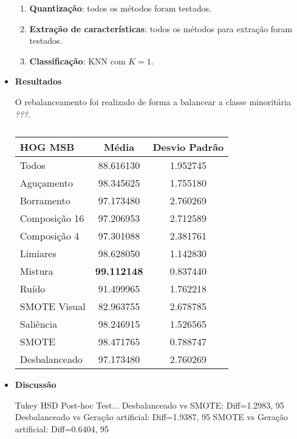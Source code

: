 \begin{itemize}
\begin{enumerate}
\item \textbf{Quantização}: todos os métodos foram testados.
\item \textbf{Extração de características}: todos os métodos para extração foram testados.
\item \textbf{Classificação}: KNN com $K=1$.
\end{enumerate}

\item[] \textbf{Resultados}

O rebalanceamento foi realizado de forma a balancear a classe minoritária \textit{???}.

\begin{minipage}{\linewidth}
\begin{table}[H]
\begin{center}
\caption{}
\label{tab:resultados:4.1}
\begin{tabular}{|l|c|c|}
\hline
\textbf{HOG MSB} & \textbf{Média}     & \textbf{Desvio Padrão} \\ \hline
   Todos        &  88.616130 &  1.952745  \\ \hline
  Aguçamento    &  98.345625 &  1.755180  \\ \hline
  Borramento    &  97.173480 &  2.760269  \\ \hline
  Composição 16 &  97.206953 &  2.712589  \\ \hline
  Composição 4  &  97.301088 &  2.381761  \\ \hline
  Limiares      &  98.628050 &  1.142830  \\ \hline
  Mistura       &  \textbf{99.112148} &  0.837440  \\ \hline
  Ruído         &  91.499965 &  1.762218  \\ \hline
  SMOTE Visual  &  82.963755 &  2.678785  \\ \hline
  Saliência     &  98.246915 &  1.526565  \\ \hline
 SMOTE          &  98.471765 &  0.788747  \\ \hline
Desbalanceado   &  97.173480 &  2.760269  \\ \hline
\end{tabular}
\end{center}
\end{table}
\end{minipage}

\item[] \textbf{Discussão}

Tukey HSD Post-hoc Test...
Desbalanceado vs SMOTE: Diff=1.2983, 95%
Desbalanceado vs Geração artificial: Diff=1.9387, 95%
SMOTE vs Geração artificial: Diff=0.6404, 95%

\end{itemize}

